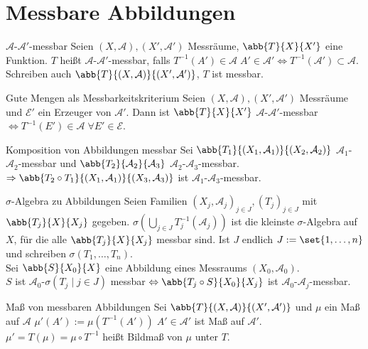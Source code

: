 \section*{Messbare Abbildungen}

\begin{karte}{\( \mathcal{A} \)-\(\mathcal{A}'\)-messbar}
	Seien \( (X, \mathcal{A}), (X', \mathcal{A}') \) Messräume, 
	\( \abb{T}{X}{X'} \) eine Funktion. \(T\) heißt \( \mathcal{A} \)-\(\mathcal{A}'\)-messbar, 
	falls \( T^{-1}(A') \in \mathcal{A} \; A'\in \mathcal{A}' \Leftrightarrow T^{-1}(\mathcal{A}') \subset \mathcal{A} \).
	Schreiben auch \( \abb{T}{(X, \mathcal{A})}{(X', \mathcal{A}')} \), \(T\) ist messbar.
\end{karte}

\begin{karte}{Gute Mengen als Messbarkeitskriterium}
	Seien \( (X, \mathcal{A}), (X', \mathcal{A}') \) Messräume und 
	\( \mathcal{E}' \) ein Erzeuger von \( \mathcal{A}' \). Dann ist 
	\( \abb{T}{X}{X'} \) \( \mathcal{A} \)-\( \mathcal{A}' \)-messbar
	\( \Leftrightarrow T^{-1}(E') \in \mathcal{A} \;\forall E' \in \mathcal{E} \).
\end{karte}

\begin{karte}{Komposition von Abbildungen messbar}
	Sei \( \abb{T_1}{(X_1, \mathcal{A}_1)}{(X_2, \mathcal{A}_2)} \) \(\mathcal{A}_1\)-
	\(\mathcal{A}_2\)-messbar und \( \abb{T_2}{\mathcal{A}_2}{\mathcal{A}_3} \) 
	\( \mathcal{A}_2 \)-\(\mathcal{A}_3\)-messbar. \\
	\( \Rightarrow \abb{T_2 \circ T_1}{(X_1, \mathcal{A}_1)}{(X_3, \mathcal{A}_3)} \) ist 
	\( \mathcal{A}_1 \)-\(\mathcal{A}_3\)-messbar.
\end{karte}

\begin{karte}{\( \sigma \)-Algebra zu Abbildungen}
	Seien Familien \( (X_j, \mathcal{A}_j)_{j \in J}, (T_j)_{j\in J} \) mit 
	\( \abb{ T_j }{X}{X_j} \) gegeben. \(  \sigma( \bigcup_{j\in J} T_j^{-1}(\mathcal{A}_j) )\) 
	ist die kleinste \( \sigma \)-Algebra auf \(X\), für die alle 
	\( \abb{T_j}{X}{X_j} \) messbar sind. 
	Ist \( J \) endlich \( J := \set{1,\ldots,n} \) und schreiben \( \sigma(T_1,\ldots, T_n) \). \\
	Sei \( \abb{S}{X_0}{X} \) eine Abbildung eines Messraums \( (X_0, \mathcal{A}_0) \). \\
	\(S\) ist \(\mathcal{A}_0\)-\( \sigma(T_j \;|\;j\in J) \) messbar 
	\( \Leftrightarrow \abb{T_j \circ S}{X_0}{X_j} \) ist \(\mathcal{A}_0\)-\(\mathcal{A}_j\)-messbar.
\end{karte}

\begin{karte}{Maß von messbaren Abbildungen}
	Sei \( \abb{T}{(X, \mathcal{A})}{(X', \mathcal{A}')} \) und \(\mu\) ein Maß auf 
	\(\mathcal{A}\) 
	\( \mu'(A') := \mu(T^{-1}(A')) \;A' \in \mathcal{A}' \) ist Maß auf \( \mathcal{A}' \).\\
	\( \mu' = T(\mu) = \mu \circ T^{-1} \) heißt Bildmaß von \( \mu \) unter \(T\).
\end{karte}